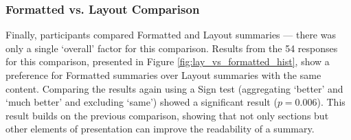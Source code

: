       \tocless\subsubsection{Formatted vs. Layout Comparison}
        \noindent Finally, participants compared Formatted and Layout summaries --- there was only a single `overall' factor for this comparison. Results from the 54 responses for this comparison, presented in Figure \ref{fig:lay_vs_formatted_hist}, show a preference for Formatted summaries over Layout summaries with the same content. Comparing the results again using a Sign test (aggregating `better' and `much better' and excluding `same') showed a significant result ($p = 0.006$). This result builds on the previous comparison, showing that not only sections but other elements of presentation can improve the readability of a summary.

